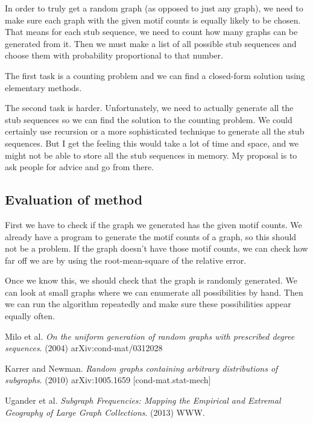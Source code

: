 \documentclass[12pt]{article}
\begin{document}
In order to truly get a random graph (as opposed to just any graph), we need to make sure each graph with the given motif counts is equally likely to be chosen.  That means for each stub sequence, we need to count how many graphs can be generated from it.  Then we must make a list of all possible stub sequences and choose them with probability proportional to that number.

The first task is a counting problem and we can find a closed-form solution using elementary methods.

The second task is harder.  Unfortunately, we need to actually generate all the stub sequences so we can find the solution to the counting problem.  We could certainly use recursion or a more sophisticated technique to generate all the stub sequences.  But I get the feeling this would take a lot of time and space, and we might not be able to store all the stub sequences in memory.  My proposal is to ask people for advice and go from there.

\subsection{Evaluation of method}
First we have to check if the graph we generated has the given motif counts.  We already have a program to generate the motif counts of a graph, so this should not be a problem.  If the graph doesn't have those motif counts, we can check how far off we are by using the root-mean-square of the relative error.

Once we know this, we should check that the graph is randomly generated.  We can look at small graphs where we can enumerate all possibilities by hand.  Then we can run the algorithm repeatedly and make sure these possibilities appear equally often.

\begin{thebibliography}{99}

  Milo et al.
  \emph{On the uniform generation of random graphs with prescribed degree sequences}.
  (2004)
  arXiv:cond-mat/0312028

   Karrer and Newman.
   \emph{Random graphs containing arbitrary distributions of subgraphs}.
   (2010)
   arXiv:1005.1659 [cond-mat.stat-mech]

   Ugander et al.
   \emph{Subgraph Frequencies: Mapping the Empirical and Extremal Geography of Large Graph Collections}.
   (2013)
   WWW.

\end{thebibliography}
\end{document}
